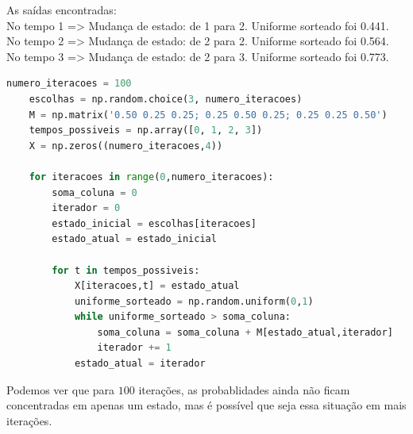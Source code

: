 \documentclass{homeworkclass}
\begin{document}
\begin{homeworkProblem}
\begin{homeworkSection}[b)Iniciando em $X(0) = 1$, e usando um gerador de números aleatórios (são necessários apenas três números aleatórios equiprováveis), calcule manualmente uma amostra do processo X(t) até $t = 3$.]
As saídas encontradas: \\
No tempo 1 => Mudança de estado: de 1 para 2. Uniforme sorteado foi 0.441. \\
No tempo 2 => Mudança de estado: de 2 para 2. Uniforme sorteado foi 0.564. \\
No tempo 3 => Mudança de estado: de 2 para 3. Uniforme sorteado foi 0.773.
\end{homeworkSection}


\begin{homeworkSection}[c) Usando um computador, execute 100 repetições do item (b). Em cada uma das 100 repetições, comece a simulação com um valor diferente de $X(0)$, assumindo que os eventos $X(0) = 0$, $X(0) = 1$ e $X(0) = 2$ são equiprováveis. Armazene as 100 cadeiras obtidas em uma matriz $\Xbf$, com 4 colunas ($t = 0$ até $t = 3$) e 100 linhas.]

\begin{lstlisting}[language=Python]
	numero_iteracoes = 100
	escolhas = np.random.choice(3, numero_iteracoes)
	M = np.matrix('0.50 0.25 0.25; 0.25 0.50 0.25; 0.25 0.25 0.50')
	tempos_possiveis = np.array([0, 1, 2, 3])
	X = np.zeros((numero_iteracoes,4))

	for iteracoes in range(0,numero_iteracoes):
		soma_coluna = 0
		iterador = 0
		estado_inicial = escolhas[iteracoes]
		estado_atual = estado_inicial

		for t in tempos_possiveis:
			X[iteracoes,t] = estado_atual
			uniforme_sorteado = np.random.uniform(0,1)
			while uniforme_sorteado > soma_coluna:
				soma_coluna = soma_coluna + M[estado_atual,iterador]
				iterador += 1
			estado_atual = iterador
\end{lstlisting}


\end{homeworkSection}




\begin{homeworkSection}[d) Fazendo histogramas de cada uma das 4 colunas, calcule as distribuições de probabilidade do processo $X(t)$ em cada um dos 4 instantes: $t = 0, \, 1 \, 2 \, 3$. Comente os resultados obtidos.]

Podemos ver que para $100$ iterações, as probablidades ainda não ficam concentradas em apenas um estado, mas é possível que seja essa situação em mais iterações.


\end{homeworkSection}
\end{homeworkProblem}
\end{document}
